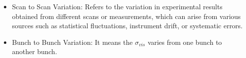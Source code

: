 \begin{itemize}

\item Scan to Scan Variation: Refers to the variation in experimental results obtained from different scans or measurements, which can arise from various sources such as statistical fluctuations, instrument drift, or systematic errors.

\item Bunch to Bunch Variation: It means the $\sigma_{vis}$  varies from one bunch to another bunch.




\end{itemize}
